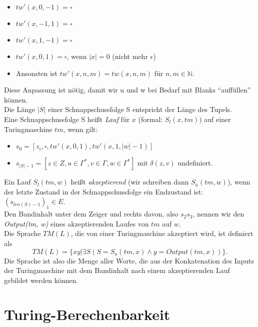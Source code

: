 \begin{itemize}
    \item $tw'(x, 0, -1) = \square$
    \item $tw'(x, -1, 1) = \square$
    \item $tw'(x, 1, -1) = \square$
    \item $tw'(x, 0, 1) = \square$, wenn $|x| = 0$ (nicht mehr $\epsilon$)
    \item Ansonsten ist $tw'(x, n, m) = tw(x, n, m)$ für $n, m \in \mathbb{N}$.
\end{itemize}
Diese Anpassung ist nötig, damit wir u und w bei Bedarf mit Blanks ``auffüllen'' können.
\\

\noindent
Die Länge $|S|$ einer Schnappschussfolge S entspricht der Länge des Tupels.
\\

\noindent
Eine Schnappschussfolge S heißt
\emph{Lauf} für $x$ (formal: $S_l(x, tm)$) auf einer Turingmaschine $tm$, wenn gilt:
\begin{itemize}
    \item $s_0 = [z_i, \square, tw'(x,0,1), tw'(x,1,|w|-1)]$
    \item $s_{|S|-1} = [z \in Z, u \in \Gamma^*, v \in \Gamma, w \in \Gamma^*]$
        mit $\delta(z, v)$ undefiniert.
\end{itemize}

\noindent
Ein Lauf $S_l(tm, w)$ heißt \emph{akzeptierend} (wir schreiben dann $S_a(tm, w)$),
wenn der letzte Zustand in der Schnappschussfolge ein Endzustand ist:
$(s_{len(S)-1})_1 \in E$.
\\

\noindent
Den Bandinhalt unter dem Zeiger und rechts davon, also $s_2s_3$,
nennen wir den \emph{Output(tm, w)} eines akzeptierenden Laufes von $tm$ auf $w$.
\\

\noindent
Die Sprache $TM(L)$, die von einer Turingmaschine akzeptiert wird, ist definiert als
\[
    TM(L) =
        \{xy|
            \exists S(
                S = S_a(tm, x)
                \wedge y = Output(tm, x)
            ) 
        \}.
\]
Die Sprache ist also die Menge aller Worte,
die aus der Konkatenation des Inputs der Turingmaschine
mit dem Bandinhalt nach einem akzeptierenden Lauf gebildet werden können.

\section{Turing-Berechenbarkeit}

